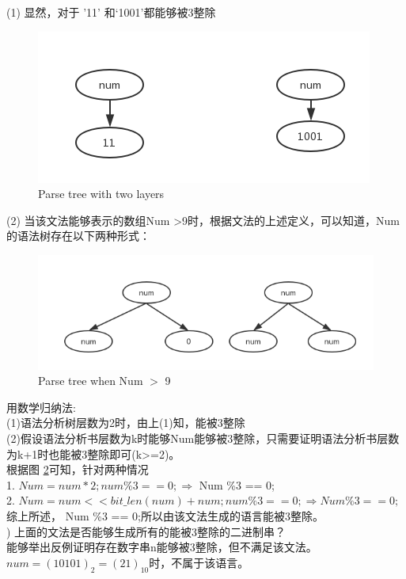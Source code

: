 \documentclass[a4paper， 16pt]{article}
\begin{document}
\begin{flushleft}
(1) 显然，对于 '11' 和‘1001’都能够被3整除\\
\begin{figure}[H]
\centering
\includegraphics[scale=0.6]{chapter2_hw1_2}
\caption{Parse tree with two layers}
\label{f2}
\end{figure}
(2) 当该文法能够表示的数组Num >9时，根据文法的上述定义，可以知道，Num的语法树存在以下两种形式：
\begin{figure}[H]
\centering
\includegraphics[scale=0.6]{chapter2_hw1_3}
\caption{Parse tree when Num $>$ 9}
\label{f2}
\end{figure}
用数学归纳法:\\
(1)语法分析树层数为2时，由上(1)知，能被3整除\\
(2)假设语法分析书层数为k时能够Num能够被3整除，只需要证明语法分析书层数为k+1时也能被3整除即可(k>=2)。\\
根据图 \ref{f2}可知，针对两种情况\\

 1. $Num = num * 2; num \%3 == 0; \Rightarrow $ Num \%3 == 0; \\
 2. $Num = num << bit\_len(num) + num; num\% 3 ==0; \Rightarrow Num \%3 ==0;$\\

综上所述， Num \%3 == 0;所以由该文法生成的语言能被3整除。\\
) 上面的文法是否能够生成所有的能被3整除的二进制串？\\

能够举出反例证明存在数字串n能够被3整除，但不满足该文法。\\
$num = (10101)_2 = (21)_{10}$时，不属于该语言。
\bigbreak


\end{flushleft}
\end{document}
